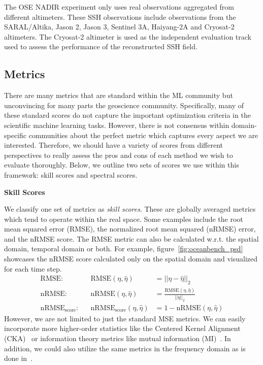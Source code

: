The OSE NADIR experiment only uses real observations aggregated from different altimeters. These SSH observations include observations from the SARAL/Altika, Jason 2, Jason 3, Sentinel 3A, Haiyang-2A and Cryosat-2 altimeters. The Cryosat-2 altimeter is used as the independent evaluation track used to assess the performance of the reconstructed SSH field.
\newpage


\subsection*{Metrics} \label{sec:metrics}

There are many metrics that are standard within the ML community but unconvincing for many parts the geoscience community. 
Specifically, many of these standard scores do not capture the important optimization criteria in the scientific machine learning tasks.
However, there is not consensus within domain-specific communities about the perfect metric which captures every aspect we are interested.
Therefore, we should have a variety of scores from different perspectives to really assess the pros and cons of each method we wish to evaluate thoroughly. 
Below, we outline two sets of scores we use within this framework: skill scores and spectral scores.

\textbf{Skill Scores}

We classify one set of metrics as \textit{skill scores}. 
These are globally averaged metrics which tend to operate within the real space.
Some examples include the root mean squared error (RMSE), the normalized root mean squared (nRMSE) error, and the nRMSE score.
The RMSE metric can also be calculated w.r.t. the spatial domain, temporal domain or both. 
For example, figure~\ref{fig:oceanbench_psd} showcases the nRMSE score calculated only on the spatial domain and visualized for each time step.
%
\begin{align}
    \text{RMSE}: &&\text{RMSE}(\eta,\hat{\eta}) &= ||\eta - \hat{\eta}||_2 \label{eq:RMSE}\\
    \text{nRMSE}: &&\text{nRMSE}(\eta,\hat{\eta}) &= \frac{\text{RMSE}(\eta,\hat{\eta})}{||\eta||_2} \label{eq:nRMSE} \\
    \text{nRMSE}_{\text{score}}: &&\text{nRMSE}_{\text{score}}(\eta,\hat{\eta}) &= 1 - \text{nRMSE}(\eta,\hat{\eta})
    \label{eq:nRMSE_score}
\end{align}
%
However, we are not limited to just the standard MSE metrics.
We can easily incorporate more higher-order statistics like the Centered Kernel Alignment (CKA)~\cite{METRICSCKA} or information theory metrics like mutual information (MI)~\cite{METRICSITRBIG,METRICSITRBIG2}.
In addition, we could also utilize the same metrics in the frequency domain as is done in~\citep{PDEBench}.

